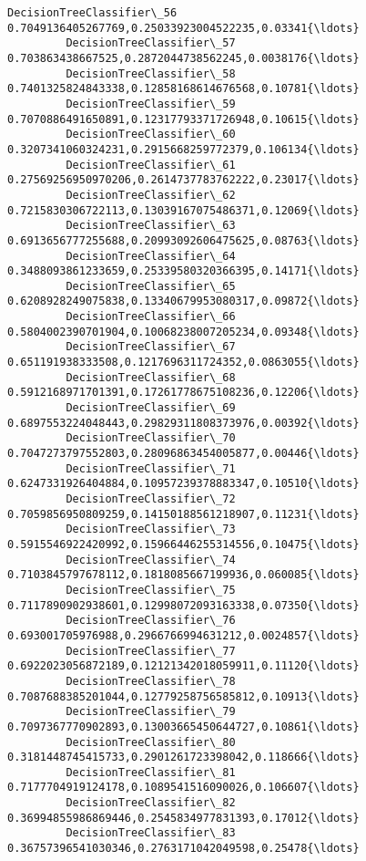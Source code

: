 \documentclass[11pt]{article}
\begin{document}
\begin{Verbatim}[commandchars=\\\{\}]
         DecisionTreeClassifier\_56   0.7049136405267769,0.25033923004522235,0.03341{\ldots}  
         DecisionTreeClassifier\_57   0.703863438667525,0.2872044738562245,0.0038176{\ldots}  
         DecisionTreeClassifier\_58   0.7401325824843338,0.12858168614676568,0.10781{\ldots}  
         DecisionTreeClassifier\_59   0.7070886491650891,0.12317793371726948,0.10615{\ldots}  
         DecisionTreeClassifier\_60   0.3207341060324231,0.2915668259772379,0.106134{\ldots}  
         DecisionTreeClassifier\_61   0.27569256950970206,0.2614737783762222,0.23017{\ldots}  
         DecisionTreeClassifier\_62   0.7215830306722113,0.13039167075486371,0.12069{\ldots}  
         DecisionTreeClassifier\_63   0.6913656777255688,0.20993092606475625,0.08763{\ldots}  
         DecisionTreeClassifier\_64   0.3488093861233659,0.25339580320366395,0.14171{\ldots}  
         DecisionTreeClassifier\_65   0.6208928249075838,0.13340679953080317,0.09872{\ldots}  
         DecisionTreeClassifier\_66   0.5804002390701904,0.10068238007205234,0.09348{\ldots}  
         DecisionTreeClassifier\_67   0.651191938333508,0.1217696311724352,0.0863055{\ldots}  
         DecisionTreeClassifier\_68   0.5912168971701391,0.17261778675108236,0.12206{\ldots}  
         DecisionTreeClassifier\_69   0.6897553224048443,0.29829311808373976,0.00392{\ldots}  
         DecisionTreeClassifier\_70   0.7047273797552803,0.28096863454005877,0.00446{\ldots}  
         DecisionTreeClassifier\_71   0.6247331926404884,0.10957239378883347,0.10510{\ldots}  
         DecisionTreeClassifier\_72   0.7059856950809259,0.14150188561218907,0.11231{\ldots}  
         DecisionTreeClassifier\_73   0.5915546922420992,0.15966446255314556,0.10475{\ldots}  
         DecisionTreeClassifier\_74   0.7103845797678112,0.1818085667199936,0.060085{\ldots}  
         DecisionTreeClassifier\_75   0.7117890902938601,0.12998072093163338,0.07350{\ldots}  
         DecisionTreeClassifier\_76   0.693001705976988,0.2966766994631212,0.0024857{\ldots}  
         DecisionTreeClassifier\_77   0.6922023056872189,0.12121342018059911,0.11120{\ldots}  
         DecisionTreeClassifier\_78   0.7087688385201044,0.12779258756585812,0.10913{\ldots}  
         DecisionTreeClassifier\_79   0.7097367770902893,0.13003665450644727,0.10861{\ldots}  
         DecisionTreeClassifier\_80   0.3181448745415733,0.2901261723398042,0.118666{\ldots}  
         DecisionTreeClassifier\_81   0.7177704919124178,0.1089541516090026,0.106607{\ldots}  
         DecisionTreeClassifier\_82   0.36994855986869446,0.2545834977831393,0.17012{\ldots}  
         DecisionTreeClassifier\_83   0.36757396541030346,0.2763171042049598,0.25478{\ldots}  

\end{Verbatim}
\end{document}
